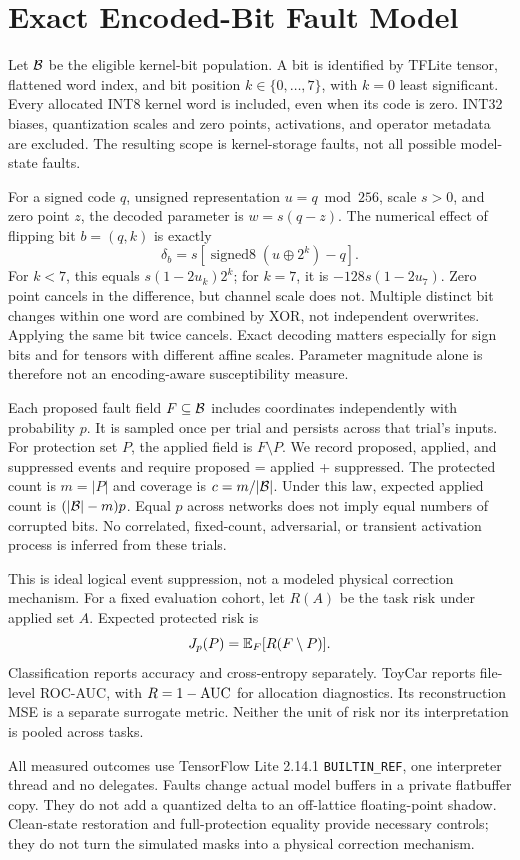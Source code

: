 \section{Exact Encoded-Bit Fault Model}
\label{sec:faults}
Let $\mathcal{B}$ be the eligible kernel-bit population. A bit is identified by TFLite tensor, flattened word index, and bit position $k\in\{0,\ldots,7\}$, with $k=0$ least significant. Every allocated INT8 kernel word is included, even when its code is zero. INT32 biases, quantization scales and zero points, activations, and operator metadata are excluded. The resulting scope is kernel-storage faults, not all possible model-state faults.

For a signed code $q$, unsigned representation $u=q\bmod256$, scale $s>0$, and zero point $z$, the decoded parameter is $w=s(q-z)$. The numerical effect of flipping bit $b=(q,k)$ is exactly
\begin{equation}
\delta_b=s\left[\operatorname{signed8}\!\left(u\mathbin{\oplus}2^k\right)-q\right].
\label{eq:delta}
\end{equation}
For $k<7$, this equals $s(1-2u_k)2^k$; for $k=7$, it is $-128s(1-2u_7)$. Zero point cancels in the difference, but channel scale does not. Multiple distinct bit changes within one word are combined by XOR, not independent overwrites. Applying the same bit twice cancels. Exact decoding matters especially for sign bits and for tensors with different affine scales. Parameter magnitude alone is therefore not an encoding-aware susceptibility measure.

Each proposed fault field $F\subseteq\mathcal{B}$ includes coordinates independently with probability $p$. It is sampled once per trial and persists across that trial's inputs. For protection set $P$, the applied field is $F\setminus P$. We record proposed, applied, and suppressed events and require proposed = applied + suppressed. The protected count is $m=|P|$ and coverage is $c=m/|\mathcal{B}|$. Under this law, expected applied count is $(|\mathcal{B}|-m)p$. Equal $p$ across networks does not imply equal numbers of corrupted bits. No correlated, fixed-count, adversarial, or transient activation process is inferred from these trials.

This is ideal logical event suppression, not a modeled physical correction
mechanism. For a fixed evaluation cohort, let $R(A)$ be the task risk under
applied set $A$. Expected protected risk is
\begin{equation}
J_p(P)=\mathbb{E}_F[R(F\setminus P)].
\label{eq:risk}
\end{equation}
Classification reports accuracy and cross-entropy separately. ToyCar reports file-level ROC-AUC, with $R=1-\operatorname{AUC}$ for allocation diagnostics. Its reconstruction MSE is a separate surrogate metric. Neither the unit of risk nor its interpretation is pooled across tasks.

All measured outcomes use TensorFlow Lite 2.14.1 \texttt{BUILTIN\_REF}, one interpreter thread and no delegates. Faults change actual model buffers in a private flatbuffer copy. They do not add a quantized delta to an off-lattice floating-point shadow. Clean-state restoration and full-protection equality provide necessary controls; they do not turn the simulated masks into a physical correction mechanism.
